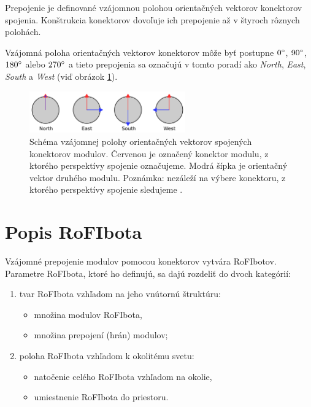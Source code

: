 \documentclass[
  digital, %
  oneside, %
  notable,   %
  lof,     %
  nolot,     %
]{fithesis3}
\begin{document}
Prepojenie je definované vzájomnou polohou orientačných vektorov konektorov spojenia. Konštrukcia konektorov dovoľuje ich prepojenie až v štyroch rôznych polohách. 

Vzájomná poloha orientačných vektorov konektorov môže byť postupne $0\degree$, $90\degree$, $180\degree$ alebo $270\degree$ a tieto prepojenia sa označujú v tomto poradí ako \textit{North}, \textit{East}, \textit{South} a \textit{West} (viď obrázok \ref{fig:dock_orientation}). 

\begin{figure}[hbt!]
    \centering
    \includegraphics[width=0.6\textwidth]{pictures/dock_orientation.pdf}
    \caption[Poloha prepojenia konektorov modulu]{Schéma vzájomnej polohy orientačných vektorov spojených konektorov modulov. Červenou je označený konektor modulu, z ktorého perspektívy spojenie označujeme. Modrá šípka je orientačný vektor druhého modulu. Poznámka: nezáleží na výbere konektoru, z ktorého perspektívy spojenie sledujeme \cite{mrazekMasterThesis}.}
    \label{fig:dock_orientation}
\end{figure}

\section{Popis RoFIbota}
\label{sec:rofibotSpec}
Vzájomné prepojenie modulov pomocou konektorov vytvára RoFIbotov. Parametre RoFIbota, ktoré ho definujú, sa dajú rozdeliť do dvoch kategórií:   
\begin{enumerate}
    \item tvar RoFIbota vzhľadom na jeho vnútornú štruktúru:
    \begin{itemize}[topsep=-5pt]
        \item množina modulov RoFIbota, 
        \item množina prepojení (hrán) modulov; 
    \end{itemize}
    
    \item poloha RoFIbota vzhľadom k okolitému svetu: 
    \begin{itemize}[topsep=-5pt]
        \item natočenie celého RoFIbota vzhľadom na okolie, 
        \item umiestnenie RoFIbota do priestoru.  
    \end{itemize}
\end{enumerate}
\end{document}
